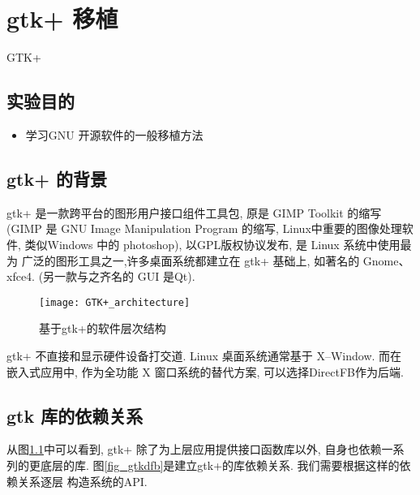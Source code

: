\chapter{gtk+ 移植}{GTK+}

\section{实验目的}
\begin{itemize}\itemsep=-3pt
  \item 学习GNU 开源软件的一般移植方法
\end{itemize}

\section{gtk+ 的背景}
    gtk+ 是一款跨平台的图形用户接口组件工具包, 原是 GIMP Toolkit 的缩写
(GIMP 是 GNU Image Manipulation Program 的缩写, Linux中重要的图像处理软件,
类似Windows 中的 photoshop), 以GPL版权协议发布, 是 Linux 系统中使用最为
广泛的图形工具之一,许多桌面系统都建立在 gtk+ 基础上, 如著名的 Gnome、xfce4.
(另一款与之齐名的 GUI 是Qt).

\begin{figure}[!h]
  \centering
  \texttt{[image: GTK+\_architecture]}
    \caption[基于gtk+的软件层次结构]
    {基于gtk+的软件层次结构\footnotemark} \label{fig_gtk}
\end{figure}

    gtk+ 不直接和显示硬件设备打交道. Linux 桌面系统通常基于 X--Window. 而在
嵌入式应用中, 作为全功能 X 窗口系统的替代方案, 可以选择DirectFB作为后端. 

\section{gtk 库的依赖关系}
从图\ref{fig_gtk}中可以看到, 
gtk+ 除了为上层应用提供接口函数库以外, 自身也依赖一系列的更底层的库.
图\ref{fig_gtkdfb}是建立gtk+的库依赖关系. 我们需要根据这样的依赖关系逐层
构造系统的API.\@

